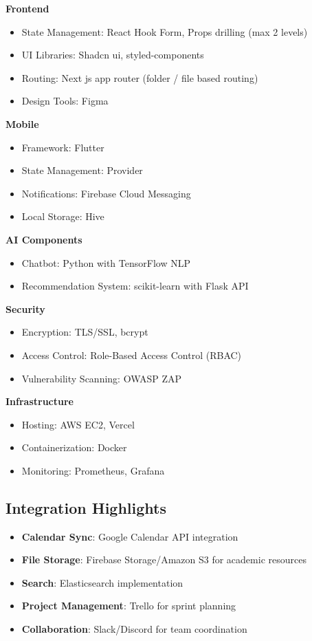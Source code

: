 \textbf{Frontend}
\begin{itemize}
    \item State Management: React Hook Form, Props drilling (max 2 levels)
    \item UI Libraries: Shadcn ui, styled-components
    \item Routing: Next js app router (folder / file based routing)
    \item Design Tools: Figma
\end{itemize}

\textbf{Mobile}
\begin{itemize}
    \item Framework: Flutter
    \item State Management: Provider
    \item Notifications: Firebase Cloud Messaging
    \item Local Storage: Hive
\end{itemize}

\textbf{AI Components}
\begin{itemize}
    \item Chatbot: Python with TensorFlow NLP
    \item Recommendation System: scikit-learn with Flask API
\end{itemize}

\textbf{Security}
\begin{itemize}
    \item Encryption: TLS/SSL, bcrypt
    \item Access Control: Role-Based Access Control (RBAC)
    \item Vulnerability Scanning: OWASP ZAP
\end{itemize}

\textbf{Infrastructure}
\begin{itemize}
    \item Hosting: AWS EC2, Vercel
    \item Containerization: Docker
    \item Monitoring: Prometheus, Grafana
\end{itemize}

\subsection{Integration Highlights}
\begin{itemize}
    \item \textbf{Calendar Sync}: Google Calendar API integration
    \item \textbf{File Storage}: Firebase Storage/Amazon S3 for academic resources
    \item \textbf{Search}: Elasticsearch implementation
    \item \textbf{Project Management}: Trello for sprint planning
    \item \textbf{Collaboration}: Slack/Discord for team coordination
\end{itemize}